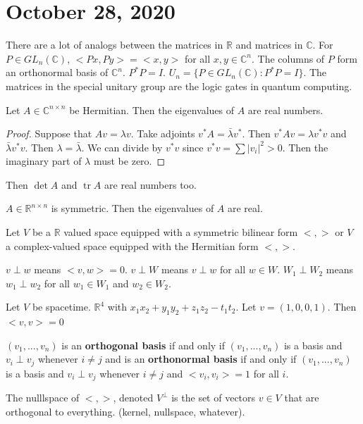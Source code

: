 \documentclass{article}
\newcommand{\vocab}[1]{\textbf{\color{blue!90}\boldmath #1}}
\newcommand{\C}{\mathbb{C}}
\newcommand{\R}{\mathbb{R}}
\DeclareMathOperator{\tr}{tr}
\begin{document}
\section{October 28, 2020}
There are a lot of analogs between the matrices in $\R$ and matrices in $\C$. For $P\in GL_n(\C)$, $<Px,Py>=<x,y>$ for all $x,y\in\C^n$. The columns of $P$ form an orthonormal basis of $\C^n$. $P^*P=I$. $U_n=\{P\in GL_n(\C):P^*P=I\}$. 
The matrices in the special unitary group are the logic gates in quantum computing.
\begin{theorem}
Let $A\in \C^{n\times n}$ be Hermitian. Then the eigenvalues of $A$ are real numbers. 
\end{theorem}
\begin{proof}
Suppose that $Av=\lambda v$. Take adjoints $v^*A=\bar{\lambda}v^*$. Then $v^*Av=\lambda v^*v$ and $\bar{\lambda}v^*v$. Then $\lambda=\bar{\lambda}$. We can divide by $v^*v$ since $v^*v=\sum|v_i|^2>0$. Then the imaginary part of $\lambda$ must be zero. 
\end{proof}
\begin{corollary}
Then $\det A$ and $\tr A$ are real numbers too.
\end{corollary}
\begin{corollary}
$A\in \R^{n\times n}$ is symmetric. Then the eigenvalues of $A$ are real.
\end{corollary}
Let $V$ be a $\R$ valued space equipped with a symmetric bilinear form $<,>$ or $V$ a complex-valued space equipped with the Hermitian form $<,>$. 
\begin{definition}
$v\perp w$ means $<v,w>=0$. $v \perp W$ means $v\perp w$ for all $w\in W$. $W_1\perp W_2$ means $w_1\perp w_2$ for all $w_1\in W_1$ and $w_2\in W_2$.
\end{definition}
\begin{example}
Let $V$ be spacetime. $\R^4$ with $x_1x_2+y_1y_2+z_1z_2-t_1t_2$. Let $v=(1,0,0,1)$. Then $<v,v>=0$ 
\end{example}
\begin{definition}
$(v_1,...,v_n)$ is an \vocab{orthogonal basis} if and only if $(v_1,...,v_n)$ is a basis and $v_i\perp v_j$ whenever $i\neq j$ and is an \vocab{orthonormal basis} if and only if $(v_1,...,v_n)$ is a basis and $v_i\perp v_j$ whenever $i\neq j$ and $<v_i,v_i>=1$ for all $i$.
\end{definition}
\begin{definition}
The nulllspace of $<,>$, denoted $V^\perp$ is the set of vectors $v\in V$ that are orthogonal to everything. (kernel, nullspace, whatever).
\end{definition}
\end{document}
